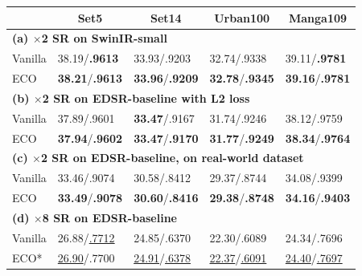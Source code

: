 \documentclass[letterpaper]{article} %
\begin{document}
\begin{table}[h]
\setlength\tabcolsep{4.0pt}
\footnotesize
\begin{tabular}{l|l|l|l|l}
\hline
\multicolumn{1}{c}{} & \multicolumn{1}{|c}{Set5} & \multicolumn{1}{|c}{Set14} & \multicolumn{1}{|c}{Urban100} & \multicolumn{1}{|c}{Manga109} \\ 
\hline
\hline
%
\multicolumn{5}{l}{\textbf{(a) $\times$2 SR on SwinIR-small}}\\
\hline
Vanilla             & 38.19/\textbf{.9613}             & 33.93/.9203             & 32.74/.9338             & 39.11/\textbf{.9781}                 \\
ECO               & \textbf{38.21}/\textbf{.9613}             & \textbf{33.96}/\textbf{.9209}             & \textbf{32.78}/\textbf{.9345}             & \textbf{39.16}/\textbf{.9781}                     \\ 
\hline
\hline
\multicolumn{5}{l}{\textbf{(b) $\times$2 SR on EDSR-baseline with L2 loss}}\\
\hline
Vanilla             & 37.89/.9601             & \textbf{33.47}/.9167             & 31.74/.9246             & 38.12/.9759                 \\
ECO               & \textbf{37.94}/\textbf{.9602}             & \textbf{33.47}/\textbf{.9170}             & \textbf{31.77}/\textbf{.9249}             & \textbf{38.34}/\textbf{.9764}                 \\ 
\hline
\hline
\multicolumn{5}{l}{\textbf{(c) $\times$2 SR on EDSR-baseline, on real-world dataset}}                                                                                                                                   \\
\hline
Vanilla             & 33.46/.9074             & 30.58/.8412             & 29.37/.8744             & 34.08/.9399                  \\
ECO              & \textbf{33.49}/\textbf{.9078}             & \textbf{30.60}/\textbf{.8416}             & \textbf{29.38}/\textbf{.8748}             & \textbf{34.16}/\textbf{.9403}                 \\ 
\hline
\hline
\multicolumn{5}{l}{\textbf{(d) $\times$8 SR on EDSR-baseline}}\\
\hline
Vanilla               & 26.88/\underline{.7712}             & 24.85/.6370             & 22.30/.6089             & 24.34/.7696                  \\  
ECO*              & \underline{26.90}/.7700                          & \underline{24.91}/\underline{.6378}             & \underline{22.37}/\underline{.6091}             & \underline{24.40}/\underline{.7697}                 \\ 

\end{tabular}
\end{table}
\end{document}
